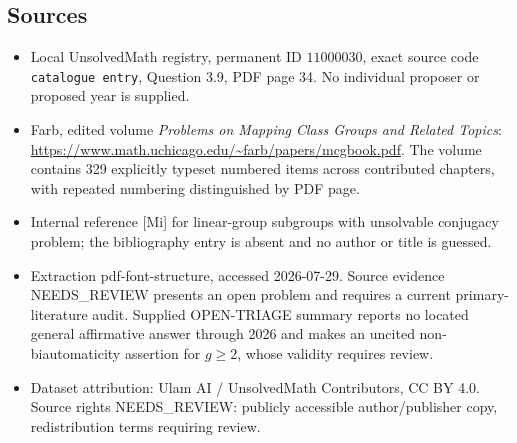 \documentclass[11pt]{article}
\begin{document}
\subsection{Sources}
\begin{itemize}
\item Local UnsolvedMath registry, permanent ID \(11000030\), exact source code \texttt{catalogue entry}, Question 3.9, PDF page 34. No individual proposer or proposed year is supplied.
\item Farb, edited volume \emph{Problems on Mapping Class Groups and Related Topics}: \url{https://www.math.uchicago.edu/~farb/papers/mcgbook.pdf}. The volume contains 329 explicitly typeset numbered items across contributed chapters, with repeated numbering distinguished by PDF page.
\item Internal reference [Mi] for linear-group subgroups with unsolvable conjugacy problem; the bibliography entry is absent and no author or title is guessed.
\item Extraction pdf-font-structure, accessed 2026-07-29. Source evidence NEEDS\_REVIEW presents an open problem and requires a current primary-literature audit. Supplied OPEN-TRIAGE summary reports no located general affirmative answer through 2026 and makes an uncited non-biautomaticity assertion for \(g\ge2\), whose validity requires review.
\item Dataset attribution: Ulam AI / UnsolvedMath Contributors, CC BY 4.0. Source rights NEEDS\_REVIEW: publicly accessible author/publisher copy, redistribution terms requiring review.
\end{itemize}
\end{document}
